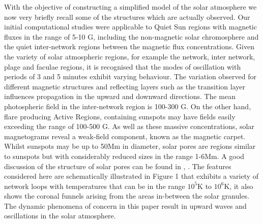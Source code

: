 \documentclass[physics,article,submit,pdftex,moreauthors]{Definitions/mdpi}
\begin{document}
%
With the objective of constructing a simplified model of the solar atmosphere we now  very briefly recall some of the structures which are  actually observed. Our initial computational studies were applicable to Quiet Sun regions with magnetic fluxes in the range of 5-10 G, including the non-magnetic solar chromosphere and the quiet inter-network regions between the magnetic flux concentrations. Given the variety of solar atmospheric regions, for example the network, inter network, plage and faculae regions, it is recognised that the modes of oscillation with periods of 3 and 5 minutes exhibit varying behaviour. The variation observed for different magnetic structures and reflecting layers such as the transition layer influences propagation in the upward and downward directions. The mean photospheric field in the inter-network region is 100-300 G. 
 On the other hand, flare producing Active Regions, containing sunspots may have fields easily  exceeding the %
range of 100-500 G. As well as these massive concentrations, solar magnetograms reveal 
 a weak-field component, known as the magnetic carpet. Whilst sunspots may be up to 50Mm in diameter, solar pores are regions similar to sunspots but with considerably reduced sizes in the range 1-6Mm. A good discussion of the structure of  solar pores can be found in \cite{Simon1970}, \cite{Cameron2007}. The features considered here are  schematically illustrated in Figure 1 that exhibits a  variety of network loops with temperatures  that  can be in the range $10^{5}$K to $10^{6}$K, it also shows the coronal funnels arising from the areas in-between the solar granules. The  dynamic phenomena of concern in this paper result in  upward waves and oscillations in the solar atmosphere. 
\end{document}
